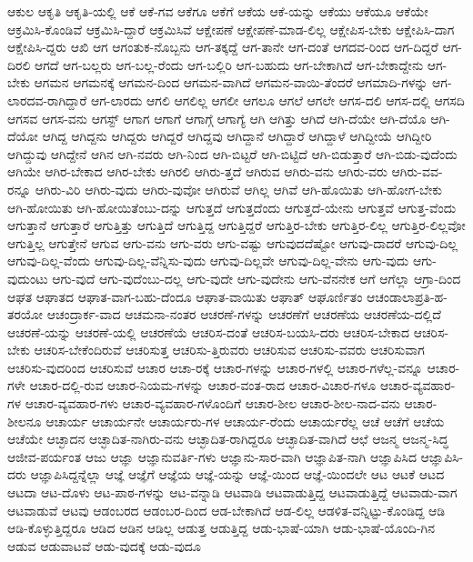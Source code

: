 {ಆಕುಲ
ಆಕೃತಿ
ಆಕೃತಿ-ಯಲ್ಲಿ
ಆಕೆ
ಆಕೆ-ಗವ
ಆಕೆಗೂ
ಆಕೆಗೆ
ಆಕೆಯ
ಆಕೆ-ಯನ್ನು
ಆಕೆಯು
ಆಕೆಯೂ
ಆಕೆಯೇ
ಆಕ್ರಮಿಸಿ-ಕೊಂಡಿವೆ
ಆಕ್ರಮಿಸಿ-ದ್ದಾರೆ
ಆಕ್ರಮಿಸಿವೆ
ಆಕ್ಷೇಪಣೆ
ಆಕ್ಷೇಪಣೆ-ಮಾಡ-ಲಿಲ್ಲ
ಆಕ್ಷೇಪಿಸ-ಬೇಕು
ಆಕ್ಷೇಪಿಸಿ-ದಾಗ
ಆಕ್ಷೇಪಿಸಿ-ದ್ದರು
ಆಖಿ
ಆಗ
ಆಗಂತುಕ-ನೊಬ್ಬನು
ಆಗ-ತಕ್ಕದ್ದೆ
ಆಗ-ತಾನೇ
ಆಗ-ದಂತೆ
ಆಗದವ-ರಿಂದ
ಆಗ-ದಿದ್ದರೆ
ಆಗ-ದಿರಲಿ
ಆಗದೆ
ಆಗ-ಬಲ್ಲರು
ಆಗ-ಬಲ್ಲ-ರೆಂದು
ಆಗ-ಬಲ್ಲಿರಿ
ಆಗ-ಬಹುದು
ಆಗ-ಬೇಕಾಗಿದೆ
ಆಗ-ಬೇಕಾದ್ದೇನು
ಆಗ-ಬೇಕು
ಆಗಮನ
ಆಗಮನಕ್ಕೆ
ಆಗಮನ-ದಿಂದ
ಆಗಮನ-ವಾಗಿದೆ
ಆಗಮನ-ವಾಯಿ-ತೆಂದರೆ
ಆಗಮಾದಿ-ಗಳನ್ನು
ಆಗ-ಲಾರದವ-ರಾಗಿದ್ದಾರೆ
ಆಗ-ಲಾರದು
ಆಗಲಿ
ಆಗಲಿಲ್ಲ
ಆಗಲೀ
ಆಗಲೂ
ಆಗಲೆ
ಆಗಲೇ
ಆಗಸ-ದಲಿ
ಆಗಸ-ದಲ್ಲಿ
ಆಗಸದಿ
ಆಗಸವ
ಆಗಸ-ವನು
ಆಗಸ್ಟ್
ಆಗಾಗ
ಆಗಾಗೆ
ಆಗಾಗ್ಗೆ
ಆಗಾಗ್ಯೆ
ಆಗಿ
ಆಗಿತ್ತು
ಆಗಿದೆ
ಆಗಿ-ದೆಯೇ
ಆಗಿ-ದೆಯೊ
ಆಗಿ-ದೆಯೋ
ಆಗಿದ್ದ
ಆಗಿದ್ದನು
ಆಗಿದ್ದರು
ಆಗಿದ್ದರೆ
ಆಗಿದ್ದವು
ಆಗಿದ್ದಾನೆ
ಆಗಿದ್ದಾರೆ
ಆಗಿದ್ದಾಳೆ
ಆಗಿದ್ದೀಯೆ
ಆಗಿದ್ದೀರಿ
ಆಗಿದ್ದುವು
ಆಗಿದ್ದೇನೆ
ಆಗಿನ
ಆಗಿ-ನವರು
ಆಗಿ-ನಿಂದ
ಆಗಿ-ಬಿಟ್ಟರೆ
ಆಗಿ-ಬಿಟ್ಟಿದೆ
ಆಗಿ-ಬಿಡುತ್ತಾರೆ
ಆಗಿ-ಬಿಡು-ವುದೆಂದು
ಆಗಿಯೇ
ಆಗಿರ-ಬೇಕಾದ
ಆಗಿರ-ಬೇಕು
ಆಗಿರಲಿ
ಆಗಿರು-ತ್ತದೆ
ಆಗಿರುವ
ಆಗಿರು-ವನು
ಆಗಿರು-ವರು
ಆಗಿರು-ವವ-ರನ್ನೂ
ಆಗಿರು-ವಿರಿ
ಆಗಿರು-ವುದು
ಆಗಿರು-ವುವೋ
ಆಗಿರುವೆ
ಆಗಿಲ್ಲ
ಆಗಿವೆ
ಆಗಿ-ಹೊಯಿತು
ಆಗಿ-ಹೋಗ-ಬೇಕು
ಆಗಿ-ಹೋಯಿತು
ಆಗಿ-ಹೋಯಿತೆಂಬು-ದನ್ನು
ಆಗುತ್ತದೆ
ಆಗುತ್ತದೆಂದು
ಆಗುತ್ತದೆ-ಯೇನು
ಆಗುತ್ತವೆ
ಆಗುತ್ತ-ವೆಂದು
ಆಗುತ್ತಾನೆ
ಆಗುತ್ತಾರೆ
ಆಗುತ್ತಿತ್ತು
ಆಗುತ್ತಿದೆ
ಆಗುತ್ತಿದ್ದ
ಆಗುತ್ತಿದ್ದರೆ
ಆಗುತ್ತಿರ-ಬೇಕು
ಆಗುತ್ತಿರ-ಲಿಲ್ಲ
ಆಗುತ್ತಿರ-ಲಿಲ್ಲವೋ
ಆಗುತ್ತಿಲ್ಲ
ಆಗುತ್ತೇನೆ
ಆಗುವ
ಆಗು-ವನು
ಆಗು-ವರು
ಆಗು-ವಷ್ಟು
ಆಗುವುದದೆಷ್ಟೋ
ಆಗುವು-ದಾದರೆ
ಆಗುವು-ದಿಲ್ಲ
ಆಗುವು-ದಿಲ್ಲ-ವೆಂದು
ಆಗುವು-ದಿಲ್ಲ-ವೆನ್ನಿಸು-ವುದು
ಆಗುವು-ದಿಲ್ಲವೇ
ಆಗುವು-ದಿಲ್ಲ-ವೇನು
ಆಗು-ವುದು
ಆಗು-ವುದುಂಟು
ಆಗು-ವುದೆ
ಆಗು-ವುದೆಂಬು-ದಲ್ಲ
ಆಗು-ವುದೇ
ಆಗು-ವುದೇನು
ಆಗು-ವೆನನೇಕ
ಆಗೆ
ಆಗೆಲ್ಲಾ
ಆಗ್ರಾ-ದಿಂದ
ಆಘತ
ಆಘಾತದ
ಆಘಾತ-ವಾಗ-ಬಹು-ದೆಂದೂ
ಆಘಾತ-ವಾಯಿತು
ಆಘಾತ್
ಆಘೂರ್ಣಿತಂ
ಆಚಂಡಾಲಾಪ್ರತಿ-ಹ-ತರಯೋ
ಆಚಂದ್ರಾರ್ಕ-ವಾದ
ಆಚಮನಾ-ನಂತರ
ಆಚರಣೆ-ಗಳನ್ನು
ಆಚರಣೆಗೆ
ಆಚರಣೆಯ
ಆಚರಣೆಯ-ದಲ್ಲಿದೆ
ಆಚರಣೆ-ಯನ್ನು
ಆಚರಣೆ-ಯಲ್ಲಿ
ಆಚರಣೆಯೆ
ಆಚರಿಸ-ದಂತೆ
ಆಚರಿಸ-ಬಯಸಿ-ದರು
ಆಚರಿಸ-ಬೇಕಾದ
ಆಚರಿಸ-ಬೇಕು
ಆಚರಿಸ-ಬೇಕೆಂದಿರುವೆ
ಆಚರಿಸುತ್ತ
ಆಚರಿಸು-ತ್ತಿರುವರು
ಆಚರಿಸುವ
ಆಚರಿಸು-ವವರು
ಆಚರಿಸುವಾಗ
ಆಚರಿಸು-ವುದರಿಂದ
ಆಚರಿಸುವೆ
ಆಚಾರ
ಆಚಾ-ರಕ್ಕೆ
ಆಚಾರ-ಗಳನ್ನು
ಆಚಾರ-ಗಳಲ್ಲಿ
ಆಚಾರ-ಗಳೆಲ್ಲ-ವನ್ನೂ
ಆಚಾರ-ಗಳೇ
ಆಚಾರ-ದಲ್ಲಿ-ರುವ
ಆಚಾರ-ನಿಯಮ-ಗಳನ್ನು
ಆಚಾರ-ವಂತ-ರಾದ
ಆಚಾರ-ವಿಚಾರ-ಗಳೂ
ಆಚಾರ-ವ್ಯವಹಾರ-ಗಳ
ಆಚಾರ-ವ್ಯವಹಾರ-ಗಳು
ಆಚಾರ-ವ್ಯವಹಾರ-ಗಳೊಂದಿಗೆ
ಆಚಾರ-ಶೀಲ
ಆಚಾರ-ಶೀಲ-ನಾದ-ವನು
ಆಚಾರ-ಶೀಲನೂ
ಆಚಾರ್ಯ
ಆಚಾರ್ಯನೇ
ಆಚಾರ್ಯರು-ಗಳ
ಆಚಾರ್ಯ-ರೆಂದು
ಆಚಾರ್ಯರೆಲ್ಲ
ಆಚೆ
ಆಚೆಗೆ
ಆಚೆಯ
ಆಚೆಯೇ
ಆಚ್ಛಾದನ
ಆಚ್ಛಾದಿತ-ನಾಗಿರು-ವನು
ಆಚ್ಛಾದಿತ-ರಾಗಿದ್ದರೂ
ಆಚ್ಛಾದಿತ-ವಾಗಿದೆ
ಆಛೆ
ಆಜನ್ಮ
ಆಜನ್ಮ-ಸಿದ್ಧ
ಆಜೀವ-ಪರ್ಯಂತ
ಆಜು
ಆಜ್ಞಾ
ಆಜ್ಞಾನುವರ್ತಿ-ಗಳು
ಆಜ್ಞಾನು-ಸಾರ-ವಾಗಿ
ಆಜ್ಞಾಪಿತ-ನಾಗಿ
ಆಜ್ಞಾಪಿಸಿದ
ಆಜ್ಞಾಪಿಸಿ-ದರು
ಆಜ್ಞಾಪಿಸಿದ್ದನ್ನೆಲ್ಲಾ
ಆಜ್ಞೆ
ಆಜ್ಞೆಗೆ
ಆಜ್ಞೆಯ
ಆಜ್ಞೆ-ಯನ್ನು
ಆಜ್ಞೆ-ಯಿಂದ
ಆಜ್ಞೆ-ಯಿಂದಲೇ
ಆಟ
ಆಟಕೆ
ಆಟದ
ಆಟದಾ
ಆಟ-ದೊಳು
ಆಟ-ಪಾಠ-ಗಳನ್ನು
ಆಟ-ವನ್ನಾಡಿ
ಆಟವಾಡಿ
ಆಟವಾಡುತ್ತಿದ್ದ
ಆಟವಾಡುತ್ತಿದ್ದೆ
ಆಟವಾಡು-ವಾಗ
ಆಟವಾಡುವೆ
ಆಟವು
ಆಡಂಬರದ
ಆಡಂಬರ-ದಿಂದ
ಆಡ-ಬೇಕಾಗಿದೆ
ಆಡ-ಲಿಲ್ಲ
ಆಡಳಿತ-ವನ್ನಿಟ್ಟು-ಕೊಂಡಿದ್ದ
ಆಡಿ
ಆಡಿ-ಕೊಳ್ಳುತ್ತಿದ್ದರೂ
ಆಡಿದ
ಆಡಿನ
ಆಡಿಲ್ಲ
ಆಡುತ್ತ
ಆಡುತ್ತಿದ್ದ
ಆಡು-ಭಾಷೆ-ಯಾಗಿ
ಆಡು-ಭಾಷೆ-ಯೊಂದಿ-ಗಿನ
ಆಡುವ
ಆಡುವಾಟವೆ
ಆಡು-ವುದಕ್ಕೆ
ಆಡು-ವುದೂ
}
